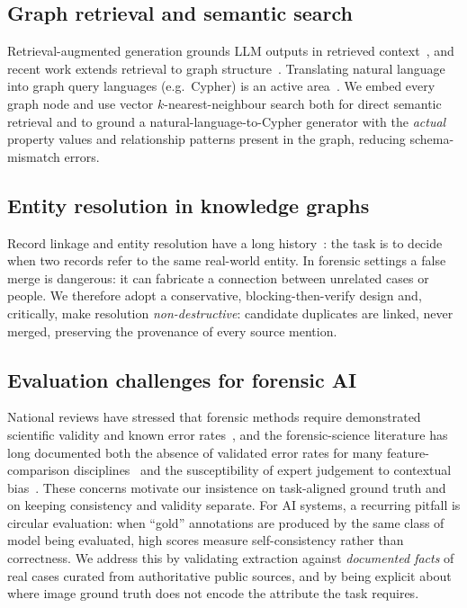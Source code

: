 \documentclass[conference]{IEEEtran}
\begin{document}
\subsection{Graph retrieval and semantic search}
Retrieval-augmented generation grounds LLM outputs in retrieved
context~\cite{lewis2020rag}, and recent work extends retrieval to graph
structure~\cite{edge2024graphrag}. Translating natural language into graph query
languages (e.g.\ Cypher) is an active area~\cite{pan2024unifying,edge2024graphrag}.
We embed every graph node and use vector $k$-nearest-neighbour search both for
direct semantic retrieval and to ground a natural-language-to-Cypher generator
with the \emph{actual} property values and relationship patterns present in the
graph, reducing schema-mismatch errors.

\subsection{Entity resolution in knowledge graphs}
Record linkage and entity resolution have a long
history~\cite{fellegi1969record,getoor2012er,christophides2020er}: the task is to
decide when two records refer to the same real-world entity. In forensic
settings a false merge is dangerous: it can fabricate a connection between
unrelated cases or people. We therefore adopt a conservative, blocking-then-verify
design and, critically, make resolution \emph{non-destructive}: candidate
duplicates are linked, never merged, preserving the provenance of every source
mention.

\subsection{Evaluation challenges for forensic AI}
National reviews have stressed that forensic methods require demonstrated
scientific validity and known error rates~\cite{nas2009forensic,pcast2016forensic},
and the forensic-science literature has long documented both the absence of
validated error rates for many feature-comparison disciplines~\cite{saks2005paradigm}
and the susceptibility of expert judgement to contextual bias~\cite{dror2006bias}.
These concerns motivate our insistence on task-aligned ground truth and on keeping
consistency and validity separate. For AI systems, a recurring pitfall is circular
evaluation: when ``gold'' annotations are produced by the same class of model being
evaluated, high scores measure self-consistency rather than correctness. We address this by validating
extraction against \emph{documented facts} of real cases curated from
authoritative public sources, and by being explicit about where image
ground truth does not encode the attribute the task requires.
\end{document}
